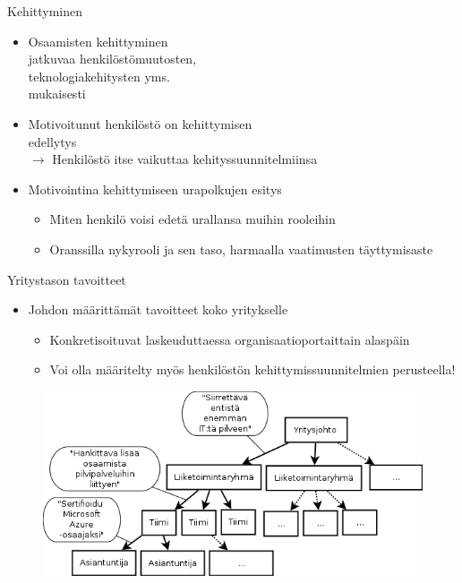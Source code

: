 \documentclass[first=purple,second=dblue,logo=redquo]{aaltoslides}
\begin{document}
\begin{frame}{Kehittyminen}
\begin{itemize}
\item Osaamisten kehittyminen \\ jatkuvaa henkilöstömuutosten, \\ teknologiakehitysten yms. \\ mukaisesti
\item Motivoitunut henkilöstö on kehittymisen \\ edellytys \\ $\rightarrow$ Henkilöstö itse vaikuttaa kehityssuunnitelmiinsa
\item Motivointina kehittymiseen urapolkujen esitys
\begin{itemize}
\item Miten henkilö voisi edetä urallansa muihin rooleihin
\item Oranssilla nykyrooli ja sen taso, harmaalla vaatimusten täyttymisaste
\end{itemize}
\end{itemize}
\end{frame}
\begin{frame}{Yritystason tavoitteet}
\begin{itemize}
\item Johdon määrittämät tavoitteet koko yritykselle
\begin{itemize}
\item Konkretisoituvat laskeuduttaessa organisaatioportaittain alaspäin
\item Voi olla määritelty myös henkilöstön kehittymissuunnitelmien perusteella!
\end{itemize}
\end{itemize}
\begin{figure}
\includegraphics[width=.8\textwidth]{tavoitesample.png}
\end{figure}
\end{frame}
\end{document}
